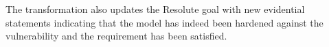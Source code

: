 The transformation also updates the Resolute goal with new evidential statements indicating that the model has indeed been hardened against the vulnerability and the requirement has been satisfied.
%
%

%
